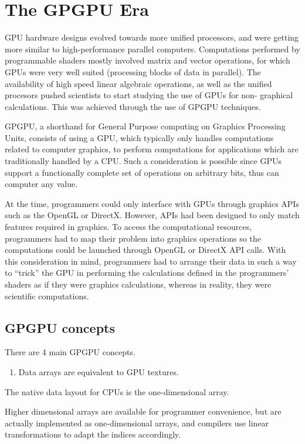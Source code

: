 \documentclass[10pt, a4paper]{report}
\begin{document}
\section*{The GPGPU Era}
GPU hardware designs evolved towards more unified processors, and were getting
more similar to high-performance parallel computers.
Computations performed by programmable shaders mostly involved matrix and vector
operations, for which GPUs were very well suited (processing blocks of data in
parallel).
The availability of high speed linear algebraic operations, as well as the
unified procesors pushed scientists to start studying the use of GPUs for non-
graphical calculations.
This was achieved through the use of GPGPU techniques.

GPGPU, a shorthand for General Purpose computing on Graphics Processing Units,
consists of using a GPU, which typically only handles computations related to
computer graphics, to perform computations for applications which are
traditionally handled by a CPU.
Such a consideration is possible since GPUs support a functionally complete set
of operations on arbitrary bits, thus can computer any value.

At the time, programmers could only interface with GPUs through graphics APIs
such as the OpenGL or DirectX.
However, APIs had been designed to only match features required in graphics.
To access the computational resources, programmers had to map their problem into
graphics operations so the computations could be launched through OpenGL or
DirectX API calls.
With this consideration in mind, programmers had to arrange their data in such a
way to ``trick'' the GPU in performing the calculations defined in the
programmers' shaders as if they were graphics calculations, whereas in reality,
they were scientific computations.

\subsection*{GPGPU concepts}
There are 4 main GPGPU concepts.

\begin{enumerate}
\item Data arrays are equivalent to GPU textures.
\end{enumerate}

The native data layout for CPUs is the one-dimensional array.

Higher dimensional arrays are available for programmer convenience, but are
actually implemented as one-dimensional arrays, and compilers use linear
transformations to adapt the indices accordingly.
\end{document}
